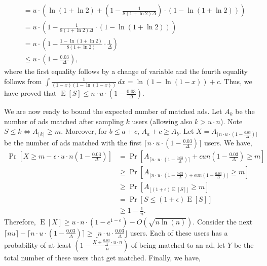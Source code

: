\documentclass[11pt]{article}
\DeclareMathOperator*{\E}{E}
\begin{document}
\begin{appendixproof}
\begin{align*}
& = u \cdot \left( \ln(1+\ln 2) + \left(1-  
\frac{1}{8(1+\ln 2)\Delta}\right) \cdot \left(1 - \ln(1+\ln2)\right)\right)\\
&= u \cdot \left( 1 -\frac{1}{8(1+\ln 2)\Delta} \cdot \left(1 - \ln(1+\ln2)\right)\right)\\
&= u \cdot \left(1 - \frac{1- \ln(1+\ln2)}{8(1+\ln2)} \cdot \frac1\Delta\right)\\
&\le  u \cdot \left(1 - \frac{0.03}\Delta\right),
\end{align*}
where the first equality follows by a change of variable and the fourth equality follows from $\int\frac{1}{(1-x)(1-\ln(1-x))} \, dx = \ln(1-\ln(1-x))+c$. Thus, we have proved that $\E[S] \leq n\cdot u \cdot (1-\frac{0.03}{\Delta})$.

We are now ready to bound the expected number of matched ads. Let $A_k$ be the number of ads matched after sampling $k$ users (allowing also $k>u\cdot n$). Note $S\leq k \iff A_{\lfloor k\rfloor} \geq m$. Moreover, for $b \leq a+c$, $A_a+c \geq A_{b}$. Let $X = A_{\lceil n \cdot u \cdot (1 - \frac{0.03}{\Delta}) \rceil}$ be the number of ads matched with the first $\lceil n \cdot u \cdot (1 - \frac{0.03}{\Delta}) \rceil$ users. We have,
\begin{align*}
\Pr\left[X \geq m - \epsilon \cdot u \cdot n\left(1 - \frac
{0.03}{\Delta}\right)\right] 
& = \Pr\left[A_{\lceil n \cdot u \cdot (1 - \frac{0.03}{\Delta}) \rceil} + \epsilon u n\left(1- \frac{0.03}{\Delta}\right) \geq m\right] \\
& \geq \Pr\left[A_{\lfloor n \cdot u \cdot (1 - \frac{0.03}{\Delta}) + \epsilon u n(1- \frac{0.03}{\Delta}) \rfloor} \geq m\right]\\
& \geq \Pr[A_{\lfloor (1+\epsilon)\E[S] \rfloor} \geq m] \\
& = \Pr[S\leq (1+\epsilon)\E[S]]\\
& \geq 1 - \frac{1}{n}.
\end{align*}
Therefore, $\E[X] \geq u\cdot n \cdot (1-e^{1-e}) - O(\sqrt{n \ln (n)})$. 
Consider the next $\lceil nu\rceil - \lceil n \cdot u \cdot (1 - \frac{0.03}{\Delta}) \rceil \geq \lfloor n\cdot u \cdot \frac{0.03}{\Delta} \rfloor$ users. Each of these users has a probability of at least $\left(1 - \frac{X+\frac{0.03}{\Delta}\cdot u\cdot n}{n}\right)$ of being matched to an ad, let $Y$ be the total number of these users that get matched. Finally, we have,


\end{appendixproof}
\end{document}
